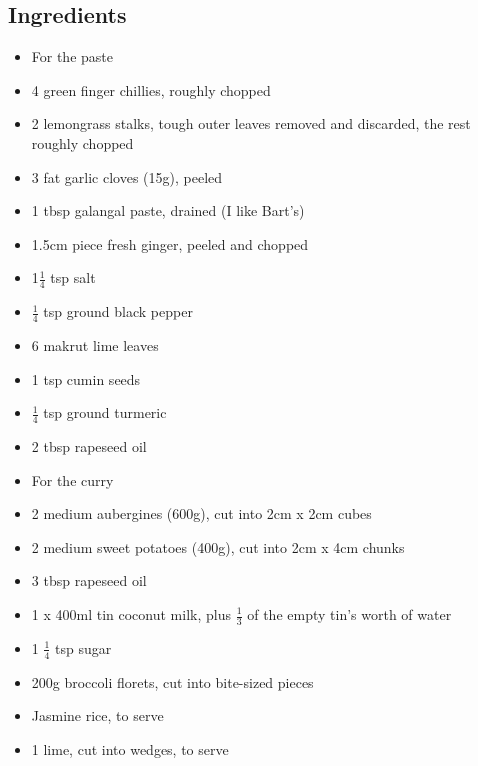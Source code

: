 \documentclass{book}
\begin{document}
\subsection*{Ingredients}
\begin{itemize}
\item For the paste
\item 4 green finger chillies, roughly chopped 
\item 2 lemongrass stalks, tough outer leaves removed and discarded, the rest roughly chopped 
\item 3 fat garlic cloves (15g), peeled
\item 1 tbsp galangal paste, drained (I like Bart’s) 
\item 1.5cm piece fresh ginger, peeled and chopped 
\item 1$\frac{1}{4}$ tsp salt 
\item $\frac{1}{4}$ tsp ground black pepper
\item 6 makrut lime leaves
\item 1 tsp cumin seeds 
\item $\frac{1}{4}$ tsp ground turmeric 
\item 2 tbsp rapeseed oil
\end{itemize}

\begin{itemize}
\item For the curry
\item 2 medium aubergines (600g), cut into 2cm x 2cm cubes
\item 2 medium sweet potatoes (400g), cut into 2cm x 4cm chunks
\item 3 tbsp rapeseed oil
\item 1 x 400ml tin coconut milk, plus $\frac{1}{3}$ of the empty tin’s worth of water
\item 1 $\frac{1}{4}$ tsp sugar
\item 200g broccoli florets, cut into bite-sized pieces
\item Jasmine rice, to serve
\item 1 lime, cut into wedges, to serve
\end{itemize}
\end{document}
